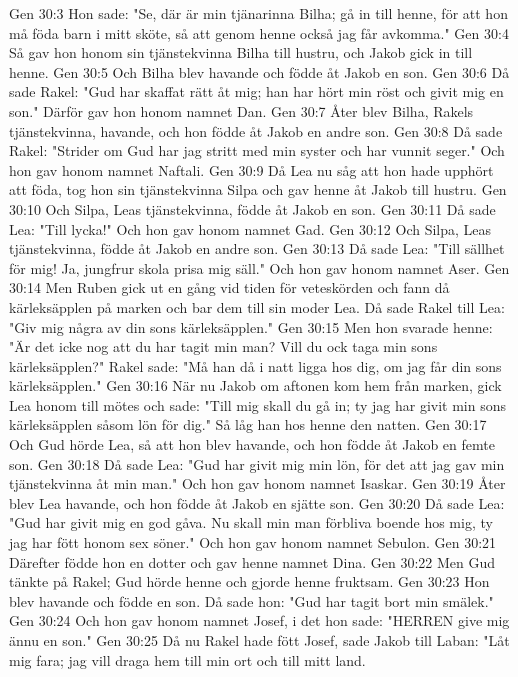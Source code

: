Gen 30:3  Hon sade: "Se, där är min tjänarinna Bilha; gå in till henne, för att hon må föda barn i mitt sköte, så att genom henne också jag får avkomma."
Gen 30:4  Så gav hon honom sin tjänstekvinna Bilha till hustru, och Jakob gick in till henne.
Gen 30:5  Och Bilha blev havande och födde åt Jakob en son.
Gen 30:6  Då sade Rakel: "Gud har skaffat rätt åt mig; han har hört min röst och givit mig en son." Därför gav hon honom namnet Dan.
Gen 30:7  Åter blev Bilha, Rakels tjänstekvinna, havande, och hon födde åt Jakob en andre son.
Gen 30:8  Då sade Rakel: "Strider om Gud har jag stritt med min syster och har vunnit seger." Och hon gav honom namnet Naftali.
Gen 30:9  Då Lea nu såg att hon hade upphört att föda, tog hon sin tjänstekvinna Silpa och gav henne åt Jakob till hustru.
Gen 30:10  Och Silpa, Leas tjänstekvinna, födde åt Jakob en son.
Gen 30:11  Då sade Lea: "Till lycka!" Och hon gav honom namnet Gad.
Gen 30:12  Och Silpa, Leas tjänstekvinna, födde åt Jakob en andre son.
Gen 30:13  Då sade Lea: "Till sällhet för mig! Ja, jungfrur skola prisa mig säll." Och hon gav honom namnet Aser.
Gen 30:14  Men Ruben gick ut en gång vid tiden för veteskörden och fann då kärleksäpplen på marken och bar dem till sin moder Lea. Då sade Rakel till Lea: "Giv mig några av din sons kärleksäpplen."
Gen 30:15  Men hon svarade henne: "Är det icke nog att du har tagit min man? Vill du ock taga min sons kärleksäpplen?" Rakel sade: "Må han då i natt ligga hos dig, om jag får din sons kärleksäpplen."
Gen 30:16  När nu Jakob om aftonen kom hem från marken, gick Lea honom till mötes och sade: "Till mig skall du gå in; ty jag har givit min sons kärleksäpplen såsom lön för dig." Så låg han hos henne den natten.
Gen 30:17  Och Gud hörde Lea, så att hon blev havande, och hon födde åt Jakob en femte son.
Gen 30:18  Då sade Lea: "Gud har givit mig min lön, för det att jag gav min tjänstekvinna åt min man." Och hon gav honom namnet Isaskar.
Gen 30:19  Åter blev Lea havande, och hon födde åt Jakob en sjätte son.
Gen 30:20  Då sade Lea: "Gud har givit mig en god gåva. Nu skall min man förbliva boende hos mig, ty jag har fött honom sex söner." Och hon gav honom namnet Sebulon.
Gen 30:21  Därefter födde hon en dotter och gav henne namnet Dina.
Gen 30:22  Men Gud tänkte på Rakel; Gud hörde henne och gjorde henne fruktsam.
Gen 30:23  Hon blev havande och födde en son. Då sade hon: "Gud har tagit bort min smälek."
Gen 30:24  Och hon gav honom namnet Josef, i det hon sade: "HERREN give mig ännu en son."
Gen 30:25  Då nu Rakel hade fött Josef, sade Jakob till Laban: "Låt mig fara; jag vill draga hem till min ort och till mitt land.
